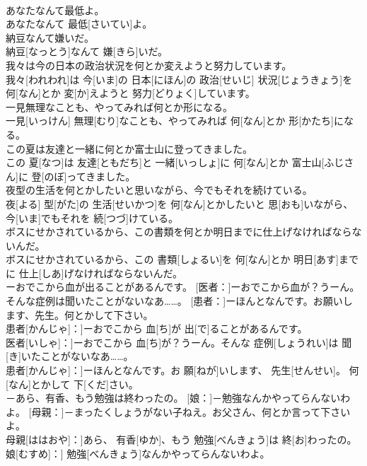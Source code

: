 \documentclass[8pt]{extreport}
\begin{document}
\begin{CJK}{UTF8}{min}
\\	あなたなんて最低よ。	
\\	あなたなんて 最低[さいてい]よ。
\\	納豆なんて嫌いだ。	
\\	納豆[なっとう]なんて 嫌[きら]いだ。
\\	我々は今の日本の政治状況を何とか変えようと努力しています。	
\\	我々[われわれ]は 今[いま]の 日本[にほん]の 政治[せいじ] 状況[じょうきょう]を 何[なん]とか 変[か]えようと 努力[どりょく]しています。
\\	一見無理なことも、やってみれば何とか形になる。	
\\	一見[いっけん] 無理[むり]なことも、やってみれば 何[なん]とか 形[かたち]になる。
\\	この夏は友達と一緒に何とか富士山に登ってきました。	
\\	この 夏[なつ]は 友達[ともだち]と 一緒[いっしょ]に 何[なん]とか 富士山[ふじさん]に 登[のぼ]ってきました。
\\	夜型の生活を何とかしたいと思いながら、今でもそれを続けている。	
\\	夜[よる] 型[がた]の 生活[せいかつ]を 何[なん]とかしたいと 思[おも]いながら、 今[いま]でもそれを 続[つづ]けている。
\\	ボスにせかされているから、この書類を何とか明日までに仕上げなければならないんだ。	
\\	ボスにせかされているから、この 書類[しょるい]を 何[なん]とか 明日[あす]までに 仕上[しあ]げなければならないんだ。
\\	[患者：]ーおでこから血が出ることがあるんです。 [医者：]ーおでこから血が？うーん。そんな症例は聞いたことがないなあ……。 [患者：]ーほんとなんです。お願いします、先生。何とかして下さい。	
\\	患者[かんじゃ]：]ーおでこから 血[ち]が 出[で]ることがあるんです。 
\\	医者[いしゃ]：]ーおでこから 血[ち]が？うーん。そんな 症例[しょうれい]は 聞[き]いたことがないなあ……。 
\\	患者[かんじゃ]：]ーほんとなんです。お 願[ねが]いします、 先生[せんせい]。 何[なん]とかして 下[くだ]さい。
\\	[母親：]－あら、有香、もう勉強は終わったの。 [娘：]－勉強なんかやってらんないわよ。 [母親：]－まったくしょうがない子ねえ。お父さん、何とか言って下さいよ。	
\\	母親[ははおや]：]あら、 有香[ゆか]、もう 勉強[べんきょう]は 終[お]わったの。 
\\	娘[むすめ]：] 勉強[べんきょう]なんかやってらんないわよ。 

\end{CJK}
\end{document}
